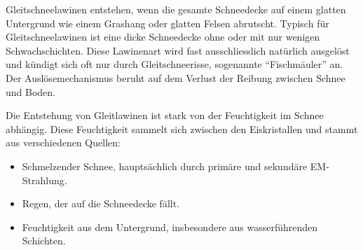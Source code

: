 


Gleitschneelawinen entstehen, wenn die gesamte Schneedecke auf einem glatten Untergrund wie einem Grashang oder glatten Felsen abrutscht. Typisch für Gleitschneelawinen ist eine dicke Schneedecke ohne oder mit nur wenigen Schwachschichten. Diese Lawinenart wird fast ausschliesslich natürlich ausgelöst und kündigt sich oft nur durch Gleitschneerisse, sogenannte “Fischmäuler” an. Der Auslösemechanismus beruht auf dem Verlust der Reibung zwischen Schnee und Boden. \cite{Mitterer.202}

Die Entstehung von Gleitlawinen ist stark von der Feuchtigkeit im Schnee abhängig. Diese Feuchtigkeit sammelt sich zwischen den Eiskristallen und stammt aus verschiedenen Quellen:

\begin{itemize}
    \item Schmelzender Schnee, hauptsächlich durch primäre und sekundäre EM-Strahlung.
    \item Regen, der auf die Schneedecke fällt.
    \item Feuchtigkeit aus dem Untergrund, insbesondere aus wasserführenden Schichten.

\end{itemize}
